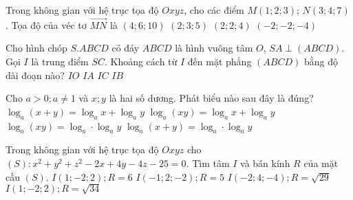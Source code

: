 \begin{ex}
{		
		
	}
\end{ex} 
\begin{ex}%
	Trong không gian với hệ trục tọa độ $Oxyz$, cho các điểm $M(1;2;3)$; $N(3;4;7)$. Tọa độ của véc tơ $\vec{MN}$ là
	\choice
	{$(4;6;10)$}
	{$(2;3;5)$}
	{\True $(2;2;4)$}
	{$(-2;-2;-4)$}
\end{ex}
\begin{ex}%
	Cho hình chóp $S.ABCD$ có đáy $ABCD$ là hình vuông tâm $O$, $SA \perp (ABCD)$. Gọi $I$ là trung điểm $SC$. Khoảng cách từ $I$ đến mặt phẳng $(ABCD)$ bằng độ dài đoạn nào?
	\choice
	{\True $IO$}
	{$IA$}
	{$IC$}
	{$IB$}
\end{ex}
\begin{ex}%
	Cho $a>0; a\ne 1$ và $x;y$ là hai số dương. Phát biểu nào sau đây là đúng?
	\choice
	{$\log_a (x+y) = \log_a x + \log_a y$}
	{\True $\log_a(xy)= \log_a x + \log_a y$}
	{$\log_a (xy) = \log_a \cdot \log_a y$}
	{$\log_a (x+y) = \log_a \cdot \log_a y$}
\end{ex}
\begin{ex}%
	Trong không gian với hệ trục tọa độ $Oxyz$ cho $(S):x^2+y^2+z^2-2x+4y-4z-25=0$. Tìm tâm $I$ và bán kính $R$ của mặt cầu $(S)$.
	\choice
	{$I(1;-2;2);R=6 $}
	{$I(-1;2;-2);R=5 $}
	{$I(-2;4;-4);R=\sqrt{29}$}
	{\True $I(1;-2;2);R=\sqrt{34}$}
\end{ex}
